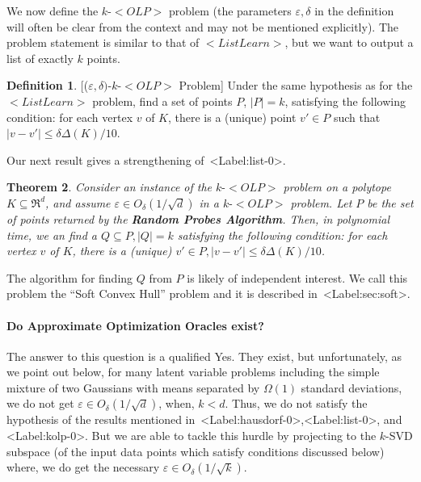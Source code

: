 \documentclass[11pt,letterpaper]{article}
\def\mathsf#1{<#1>}%
\def\xspace{}%
\def\Cref#1{<Label:#1>}%
\newtheorem{theorem}{Theorem}[section]
\theoremstyle{definition}
\newtheorem{defn}[theorem]{Definition}
\theoremstyle{remark}
\newcommand{\olp}{{\mathsf {OLP}}\xspace}
\newcommand{\kolp}{k\mbox{-}\olp}
\newcommand{\ListLearn}{\mathsf {ListLearn}\xspace}
\begin{document}
We now define the $\kolp$ problem (the parameters $\varepsilon, \delta$ in the definition will often be clear from the context and may not be mentioned explicitly). The problem statement is similar to that of $\ListLearn$, but we want to output a list of exactly $k$ points. 
\begin{defn}\label{OLP}[($\varepsilon,\delta)$-$\kolp$ Problem]
Under the same hypothesis as for the $\ListLearn$ problem, find  a set of points $P$,  $|P|=k$, satisfying the following condition: for each vertex $v$ of $K$, there is a (unique) point $ v'\in P$ such that  $|v-v'|\leq\delta\Delta(K)/10$.
\end{defn}

Our next result gives a strengthening of~\Cref{list-0}. 
\begin{theorem}\label{kolp-0}
Consider an instance of the $\kolp$ problem on a polytope $K \subseteq \Re^d$, and assume 
$\varepsilon \in O_\delta(1/\sqrt d)$ in a $\kolp$ problem. Let $P$ be the set of points returned by the {\bf Random Probes Algorithm}. Then, in polynomial time, we an find a $Q\subseteq P, |Q|=k$ satisfying the following condition:  for each vertex $v$ of $K$,  there is a (unique) $v'\in P, |v-v'|\leq\delta\Delta(K)/10$.
\end{theorem}

The algorithm for finding $Q$ from $P$ is likely of independent interest. We call this problem the ``Soft Convex Hull'' problem and it is described in~\Cref{sec:soft}.

\paragraph{Do Approximate Optimization Oracles exist?}
\label{Data-Gen-1}
The answer to this question is a qualified Yes. They exist, but unfortunately, as we point out below,  for many latent variable problems including the simple mixture of two Gaussians with means separated by $\Omega(1)$ standard deviations, we do not get $\varepsilon\in O_\delta(1/\sqrt d)$, when, $k<d$. Thus,  we do not satisfy the hypothesis of the results mentioned in~\Cref{hausdorf-0},\Cref{list-0}, and \Cref{kolp-0}.  
But we are able to tackle this hurdle by projecting to the $k$-SVD subspace (of the input data points which satisfy conditions discussed below) where, we do get the necessary 
$\varepsilon\in O_\delta(1/\sqrt k)$. 
\end{document}
